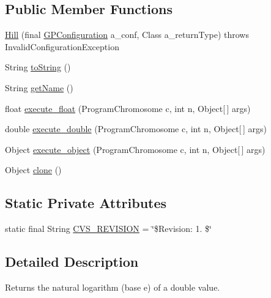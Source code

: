 \subsection*{Public Member Functions}
\begin{DoxyCompactItemize}
\item 
\hyperlink{classexamples_1_1gp_1_1symbolic_regression_1_1_hill_a9e377f1860fbeb017755e2ab49e81097}{Hill} (final \hyperlink{classorg_1_1jgap_1_1gp_1_1impl_1_1_g_p_configuration}{G\-P\-Configuration} a\-\_\-conf, Class a\-\_\-return\-Type)  throws Invalid\-Configuration\-Exception 
\item 
String \hyperlink{classexamples_1_1gp_1_1symbolic_regression_1_1_hill_a97fd22dcbc68efabc5b2e3a1222bf249}{to\-String} ()
\item 
String \hyperlink{classexamples_1_1gp_1_1symbolic_regression_1_1_hill_a2c3c2d5e9b4ffd77ef571bdbe6307c8a}{get\-Name} ()
\item 
float \hyperlink{classexamples_1_1gp_1_1symbolic_regression_1_1_hill_a2c96b08eee0030a5f882b267f4897a15}{execute\-\_\-float} (Program\-Chromosome c, int n, Object\mbox{[}$\,$\mbox{]} args)
\item 
double \hyperlink{classexamples_1_1gp_1_1symbolic_regression_1_1_hill_a7315a40fcd419f6d6c3fa422cff006ee}{execute\-\_\-double} (Program\-Chromosome c, int n, Object\mbox{[}$\,$\mbox{]} args)
\item 
Object \hyperlink{classexamples_1_1gp_1_1symbolic_regression_1_1_hill_a6d161943773180f3e1319fb27543a722}{execute\-\_\-object} (Program\-Chromosome c, int n, Object\mbox{[}$\,$\mbox{]} args)
\item 
Object \hyperlink{classexamples_1_1gp_1_1symbolic_regression_1_1_hill_a1601e6e3847c302fe195c51c4fc12607}{clone} ()
\end{DoxyCompactItemize}
\subsection*{Static Private Attributes}
\begin{DoxyCompactItemize}
\item 
static final String \hyperlink{classexamples_1_1gp_1_1symbolic_regression_1_1_hill_a0c4f0e33aed4e6afd8083d43680882f4}{C\-V\-S\-\_\-\-R\-E\-V\-I\-S\-I\-O\-N} = \char`\"{}\$Revision\-: 1. \$\char`\"{}
\end{DoxyCompactItemize}


\subsection{Detailed Description}
Returns the natural logarithm (base e) of a double value.

